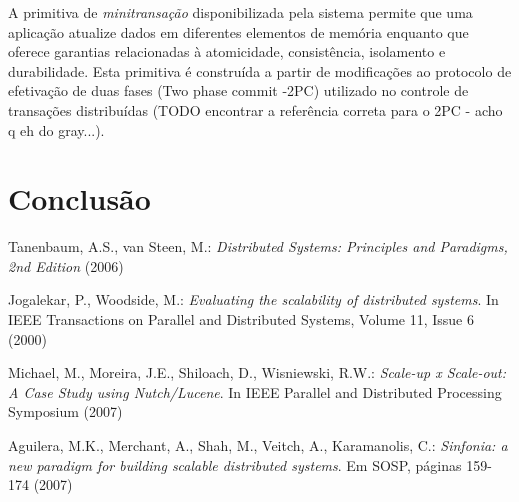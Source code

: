 \documentclass[a4paper,12pt]{report}
\begin{document}
A primitiva de {\em minitransação} disponibilizada pela sistema permite que uma aplicação atualize dados em diferentes elementos de memória enquanto que oferece garantias relacionadas à atomicidade, consistência, isolamento e durabilidade. Esta primitiva é construída a partir de modificações ao protocolo de efetivação de duas fases (Two phase commit -2PC) utilizado no controle de transações distribuídas (TODO encontrar a referência correta para o 2PC - acho q eh do gray...). 

\chapter{Conclusão}

\begin{thebibliography}{99}

 Tanenbaum, A.S., van Steen, M.: {\em Distributed Systems: Principles and Paradigms, 2nd Edition} (2006)

 Jogalekar, P., Woodside, M.: {\em Evaluating the scalability of distributed systems}. In IEEE Transactions on Parallel and Distributed Systems, Volume 11, Issue 6 (2000)

 Michael, M., Moreira, J.E., Shiloach, D., Wisniewski, R.W.: {\em Scale-up x Scale-out: A Case Study using Nutch/Lucene}. In IEEE Parallel and Distributed Processing Symposium (2007)

 Aguilera, M.K., Merchant, A., Shah, M., Veitch, A., Karamanolis, C.: {\em Sinfonia: a new paradigm for building scalable distributed systems}. Em SOSP, páginas 159-174 (2007)

\end{thebibliography}
\end{document}
